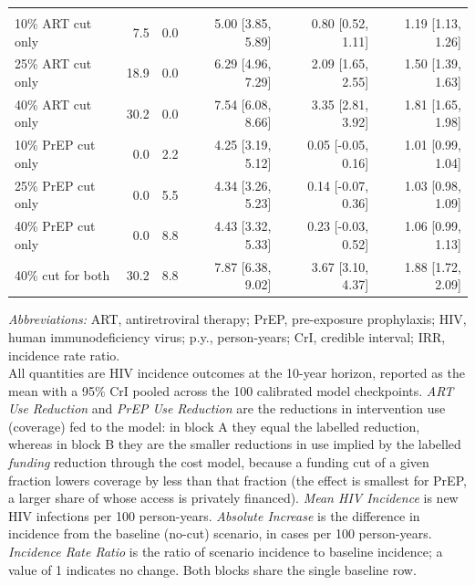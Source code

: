 \begin{landscape}
\begin{table}[!h]
{\begin{tabular}[t]{lrrrrr}
\addlinespace[0.6em]
\multicolumn{6}{l}{\textbf{B. Government funding reduction}}\\
\hspace{1em}10\% ART cut only & 7.5 & 0.0 & \phantom{0}5.00 [3.85, \phantom{0}5.89] & 0.80 [\phantom{-}0.52, 1.11] & 1.19 [1.13, 1.26]\\
\hspace{1em}25\% ART cut only & 18.9 & 0.0 & \phantom{0}6.29 [4.96, \phantom{0}7.29] & 2.09 [\phantom{-}1.65, 2.55] & 1.50 [1.39, 1.63]\\
\hspace{1em}40\% ART cut only & 30.2 & 0.0 & \phantom{0}7.54 [6.08, \phantom{0}8.66] & 3.35 [\phantom{-}2.81, 3.92] & 1.81 [1.65, 1.98]\\
\hspace{1em}10\% PrEP cut only & 0.0 & 2.2 & \phantom{0}4.25 [3.19, \phantom{0}5.12] & 0.05 [-0.05, 0.16] & 1.01 [0.99, 1.04]\\
\hspace{1em}25\% PrEP cut only & 0.0 & 5.5 & \phantom{0}4.34 [3.26, \phantom{0}5.23] & 0.14 [-0.07, 0.36] & 1.03 [0.98, 1.09]\\
\hspace{1em}40\% PrEP cut only & 0.0 & 8.8 & \phantom{0}4.43 [3.32, \phantom{0}5.33] & 0.23 [-0.03, 0.52] & 1.06 [0.99, 1.13]\\
\hspace{1em}40\% cut for both & 30.2 & 8.8 & \phantom{0}7.87 [6.38, \phantom{0}9.02] & 3.67 [\phantom{-}3.10, 4.37] & 1.88 [1.72, 2.09]\\
\bottomrule
\end{tabular}}
\vspace{0.4em}
{\footnotesize\begin{minipage}{\linewidth}
\emph{Abbreviations:} ART, antiretroviral therapy; PrEP, pre-exposure prophylaxis; HIV, human immunodeficiency virus; p.y., person-years; CrI, credible interval; IRR, incidence rate ratio.\\[0.3em]
All quantities are HIV incidence outcomes at the 10-year horizon, reported as the mean with a 95\% CrI pooled across the 100 calibrated model checkpoints. \emph{ART Use Reduction} and \emph{PrEP Use Reduction} are the reductions in intervention use (coverage) fed to the model: in block A they equal the labelled reduction, whereas in block B they are the smaller reductions in use implied by the labelled \emph{funding} reduction through the cost model, because a funding cut of a given fraction lowers coverage by less than that fraction (the effect is smallest for PrEP, a larger share of whose access is privately financed). \emph{Mean HIV Incidence} is new HIV infections per 100 person-years. \emph{Absolute Increase} is the difference in incidence from the baseline (no-cut) scenario, in cases per 100 person-years. \emph{Incidence Rate Ratio} is the ratio of scenario incidence to baseline incidence; a value of 1 indicates no change. Both blocks share the single baseline row.
\end{minipage}}
\end{table}
\end{landscape}

